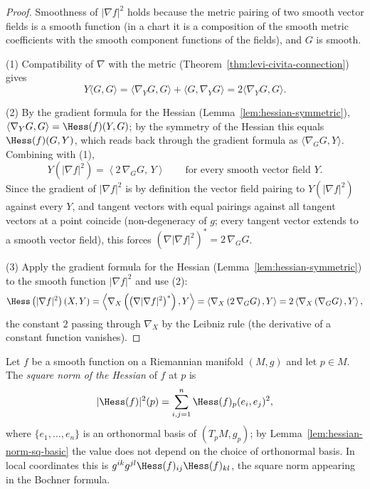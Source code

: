 \begin{proof}
\leanok
Smoothness of $|\nabla f|^2$ holds because the metric pairing of two
smooth vector fields is a smooth function (in a chart it is a
composition of the smooth metric coefficients with the smooth
component functions of the fields), and $G$ is smooth.

(1) Compatibility of $\nabla$ with the metric
(Theorem~\ref{thm:levi-civita-connection}) gives
$$Y\langle G,G\rangle
=\langle\nabla_YG,G\rangle+\langle G,\nabla_YG\rangle
=2\langle\nabla_YG,G\rangle.$$

(2) By the gradient formula for the Hessian
(Lemma~\ref{lem:hessian-symmetric}),
$\langle\nabla_YG,G\rangle=\Hess(f)(Y,G)$; by the symmetry of the
Hessian this equals $\Hess(f)(G,Y)$, which reads back through the
gradient formula as $\langle\nabla_GG,Y\rangle$. Combining with (1),
$$Y\left(|\nabla f|^2\right)
=\left\langle 2\,\nabla_GG,\,Y\right\rangle
\qquad\text{for every smooth vector field }Y.$$
Since the gradient of $|\nabla f|^2$ is by definition the vector
field pairing to $Y\left(|\nabla f|^2\right)$ against every $Y$, and
tangent vectors with equal pairings against all tangent vectors at a
point coincide (non-degeneracy of $g$; every tangent vector extends
to a smooth vector field), this forces
$\left(\nabla|\nabla f|^2\right)^*=2\,\nabla_GG$.

(3) Apply the gradient formula for the Hessian
(Lemma~\ref{lem:hessian-symmetric}) to the smooth function
$|\nabla f|^2$ and use (2):
$$\Hess\left(|\nabla f|^2\right)(X,Y)
=\left\langle\nabla_X\left(\left(\nabla|\nabla f|^2\right)^*\right),
Y\right\rangle
=\left\langle\nabla_X\left(2\,\nabla_GG\right),Y\right\rangle
=2\left\langle\nabla_X\left(\nabla_GG\right),Y\right\rangle,$$
the constant $2$ passing through $\nabla_X$ by the Leibniz rule
(the derivative of a constant function vanishes).
\end{proof}

\begin{definition}
\label{def:hessian-norm-sq}
\leanok
Let $f$ be a smooth function on a Riemannian manifold $(M,g)$ and
let $p\in M$. The \textit{square norm of the Hessian} of $f$ at $p$
is
$$|\Hess(f)|^2(p)=\sum_{i,j=1}^n\Hess(f)_p(e_i,e_j)^2,$$
where $\{e_1,\ldots,e_n\}$ is an orthonormal basis of $(T_pM,g_p)$;
by Lemma~\ref{lem:hessian-norm-sq-basic} the value does not depend
on the choice of orthonormal basis. In local coordinates this is
$g^{ik}g^{jl}\Hess(f)_{ij}\Hess(f)_{kl}$, the square norm appearing
in the Bochner formula.
\end{definition}

